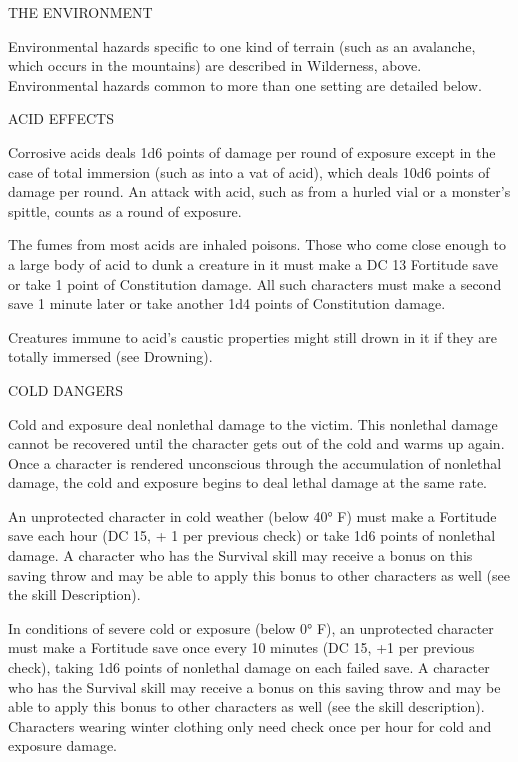 \documentclass{article}
\begin{document}
\vspace{12pt}
{\LARGE{}THE ENVIRONMENT}

Environmental hazards specific to one kind of terrain (such as an avalanche, which 
occurs in the mountains) are described in Wilderness, above. Environmental hazards 
common to more than one setting are detailed below.

\vspace{12pt}
ACID EFFECTS

Corrosive acids deals 1d6 points of damage per round of exposure except in the 
case of total immersion (such as into a vat of acid), which deals 10d6 points of 
damage per round. An attack with acid, such as from a hurled vial or a monster's 
spittle, counts as a round of exposure.

The fumes from most acids are inhaled poisons. Those who come close enough to a 
large body of acid to dunk a creature in it must make a DC 13 Fortitude save or 
take 1 point of Constitution damage. All such characters must make a second save 
1 minute later or take another 1d4 points of Constitution damage.

Creatures immune to acid's caustic properties might still drown in it if they are 
totally immersed (see Drowning).

\vspace{12pt}
COLD DANGERS

Cold and exposure deal nonlethal damage to the victim. This nonlethal damage cannot 
be recovered until the character gets out of the cold and warms up again. Once 
a character is rendered unconscious through the accumulation of nonlethal damage, 
the cold and exposure begins to deal lethal damage at the same rate.

An unprotected character in cold weather (below 40° F) must make a Fortitude save 
each hour (DC 15, + 1 per previous check) or take 1d6 points of nonlethal damage. 
A character who has the Survival skill may receive a bonus on this saving throw 
and may be able to apply this bonus to other characters as well (see the skill 
Description).

In conditions of severe cold or exposure (below 0° F), an unprotected character 
must make a Fortitude save once every 10 minutes (DC 15, +1 per previous check), 
taking 1d6 points of nonlethal damage on each failed save. A character who has 
the Survival skill may receive a bonus on this saving throw and may be able to 
apply this bonus to other characters as well (see the skill description). Characters 
wearing winter clothing only need check once per hour for cold and exposure damage.
\end{document}
